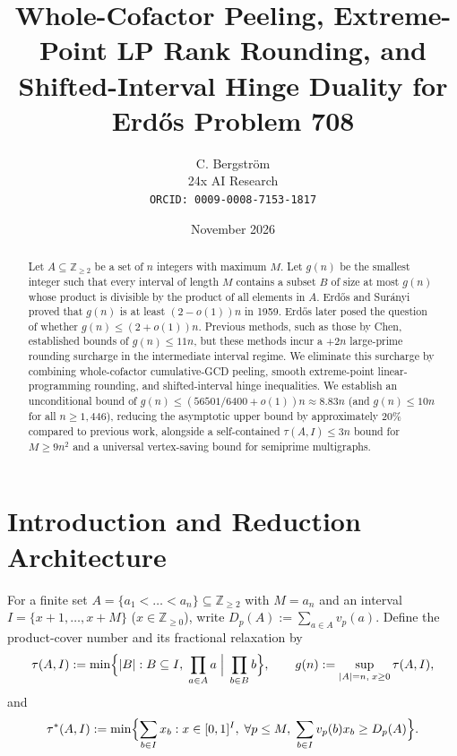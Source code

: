 \documentclass[11pt]{article}
\title{Whole-Cofactor Peeling, Extreme-Point LP Rank Rounding, and\\ Shifted-Interval Hinge Duality for Erd\H{o}s Problem 708}
\author{C. Bergstr\"om \\ 24x AI Research \\ \texttt{ORCID: 0009-0008-7153-1817}}
\date{November 2026}
\theoremstyle{remark}
\begin{document}
\maketitle

\begin{abstract}
Let $A \subseteq \mathbb{Z}_{\ge 2}$ be a set of $n$ integers with maximum $M$. Let $g(n)$ be the smallest integer such that every interval of length $M$ contains a subset $B$ of size at most $g(n)$ whose product is divisible by the product of all elements in $A$. Erd\H{o}s and Sur\'anyi proved that $g(n)$ is at least $(2 - o(1)) n$ in 1959. Erd\H{o}s later posed the question of whether $g(n) \le (2 + o(1)) n$. Previous methods, such as those by Chen, established bounds of $g(n) \le 11n$, but these methods incur a $+2n$ large-prime rounding surcharge in the intermediate interval regime. We eliminate this surcharge by combining whole-cofactor cumulative-GCD peeling, smooth extreme-point linear-programming rounding, and shifted-interval hinge inequalities. We establish an unconditional bound of $g(n) \le (56501 / 6400 + o(1)) n \approx 8.83n$ (and $g(n) \le 10n$ for all $n \ge 1{,}446$), reducing the asymptotic upper bound by approximately 20\% compared to previous work, alongside a self-contained $\tau(A, I) \le 3n$ bound for $M \ge 9n^2$ and a universal vertex-saving bound for semiprime multigraphs.
\end{abstract}

\section{Introduction and Reduction Architecture}

For a finite set $A = \{a_1 < \dots < a_n\} \subseteq \mathbb{Z}_{\ge 2}$ with $M = a_n$ and an interval $I = \{x + 1, \dots, x + M\}$ ($x \in \mathbb{Z}_{\ge 0}$), write $D_p(A) := \sum_{a \in A} v_p(a)$. Define the product-cover number and its fractional relaxation by
\[
\tau(A, I) := \min\Bigl\{ |B| : B \subseteq I, \; \prod_{a \in A} a \;\Big|\; \prod_{b \in B} b \Bigr\}, \qquad g(n) := \sup_{|A| = n, \; x \ge 0} \tau(A, I),
\]
and
\[
\tau^*(A, I) := \min\Bigl\{ \sum_{b \in I} x_b : x \in [0, 1]^I, \; \forall p \le M, \; \sum_{b \in I} v_p(b) x_b \ge D_p(A) \Bigr\}.
\]
\end{document}
